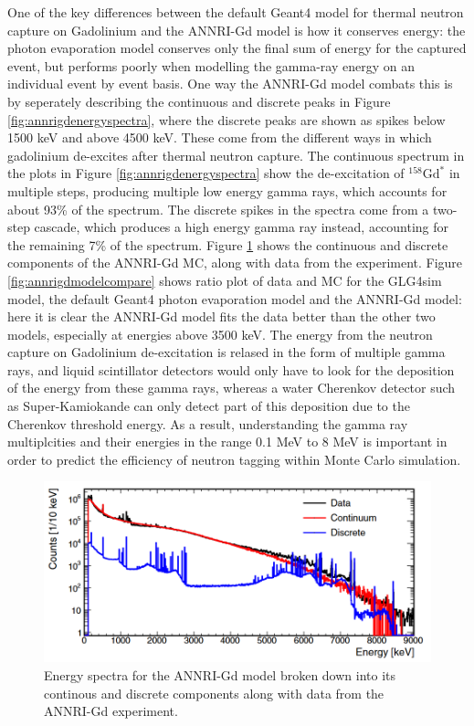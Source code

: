 One of the key differences between the default Geant4 model for thermal neutron capture on Gadolinium and the ANNRI-Gd model is how it conserves energy: the photon evaporation model conserves only the final sum of energy for the captured event, but performs poorly when modelling the gamma-ray energy on an individual event by event basis. One way the ANNRI-Gd model combats this is by seperately describing the continuous and discrete peaks in Figure \ref{fig:annrigdenergyspectra}, where the discrete peaks are shown as spikes below 1500 keV and above 4500 keV. These come from the different ways in which gadolinium de-excites after thermal neutron capture. The continuous spectrum in the plots in Figure \ref{fig:annrigdenergyspectra} show the de-excitation of ${ }^{158} \mathrm{Gd}^{*}$ in multiple steps, producing multiple low energy gamma rays, which accounts for about 93\% of the spectrum. The discrete spikes in the spectra come from a two-step cascade, which produces a high energy gamma ray instead, accounting for the remaining 7\% of the spectrum.
Figure \ref{fig:continousdiscrete} shows the continuous and discrete components of the ANNRI-Gd MC, along with data from the experiment. Figure \ref{fig:annrigdmodelcompare} shows ratio plot of data and MC for the GLG4sim model, the default Geant4 photon evaporation model and the ANNRI-Gd model: here it is clear the ANNRI-Gd model fits the data better than the other two models, especially at energies above 3500 keV. The energy from the neutron capture on Gadolinium de-excitation is relased in the form of multiple gamma rays, and liquid scintillator detectors would only have to look for the deposition of the energy from these gamma rays, whereas a water Cherenkov detector such as Super-Kamiokande can only detect part of this deposition due to the Cherenkov threshold energy. As a result, understanding the gamma ray multiplcities and their energies in the range 0.1 MeV to 8 MeV is important in order to predict the efficiency of neutron tagging within Monte Carlo simulation.


\begin{figure}
\includegraphics[width=\textwidth]{Figures/continousdiscrete.png}
\caption{Energy spectra for the ANNRI-Gd model broken down into its continous and discrete components along with data from the ANNRI-Gd experiment.\cite{10.1093/ptep/ptz002}}
\label{fig:continousdiscrete}
\end{figure}

